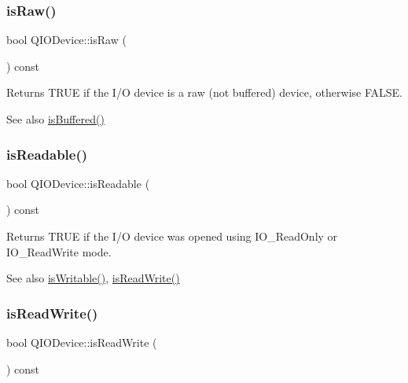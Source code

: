 \subsubsection{\texorpdfstring{isRaw()}{isRaw()}}
{\footnotesize\ttfamily bool Q\+I\+O\+Device\+::is\+Raw (\begin{DoxyParamCaption}{ }\end{DoxyParamCaption}) const\hspace{0.3cm}{\ttfamily [inline]}}

Returns T\+R\+UE if the I/O device is a raw (not buffered) device, otherwise F\+A\+L\+SE. \begin{DoxySeeAlso}{See also}
\mbox{\hyperlink{class_q_i_o_device_a643b4378bee07a7d8f6ab59dfd17df80}{is\+Buffered()}} 
\end{DoxySeeAlso}
\mbox{\label{class_q_i_o_device_a3bba4665b92eabfeca6905e7561cc943}} 
\subsubsection{\texorpdfstring{isReadable()}{isReadable()}}
{\footnotesize\ttfamily bool Q\+I\+O\+Device\+::is\+Readable (\begin{DoxyParamCaption}{ }\end{DoxyParamCaption}) const\hspace{0.3cm}{\ttfamily [inline]}}

Returns T\+R\+UE if the I/O device was opened using {\ttfamily I\+O\+\_\+\+Read\+Only} or {\ttfamily I\+O\+\_\+\+Read\+Write} mode. \begin{DoxySeeAlso}{See also}
\mbox{\hyperlink{class_q_i_o_device_ab033a6ee76263214267daf8b62ade3c7}{is\+Writable()}}, \mbox{\hyperlink{class_q_i_o_device_af362cdbc70c8cbd30bcb4aaaf7c8e9e2}{is\+Read\+Write()}} 
\end{DoxySeeAlso}
\mbox{\label{class_q_i_o_device_af362cdbc70c8cbd30bcb4aaaf7c8e9e2}} 
\subsubsection{\texorpdfstring{isReadWrite()}{isReadWrite()}}
{\footnotesize\ttfamily bool Q\+I\+O\+Device\+::is\+Read\+Write (\begin{DoxyParamCaption}{ }\end{DoxyParamCaption}) const\hspace{0.3cm}{\ttfamily [inline]}}

